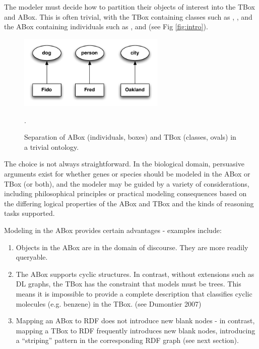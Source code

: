 \documentclass{my}
\begin{document}
The modeler must decide how to partition their objects of interest
into the TBox and ABox. This is often trivial, with the TBox
containing classes such as , ,  and the
ABox containing individuals such as ,  and
 (see Fig \ref{fig:intro}).

\begin{figure}
\center
\includegraphics[width=7cm]{intro}
\caption{Separation of ABox (individuals, boxes) and TBox (classes,
  ovals) in a trivial ontology. }.
\label{fig:into}
\end{figure}


The choice is not always straightforward. In the biological domain,
persuasive arguments exist for whether genes or species should be
modeled in the ABox or TBox (or both), and the modeler may be guided
by a variety of considerations, including philosophical principles or
practical modeling consequences based on the differing logical
properties of the ABox and TBox and the kinds of reasoning tasks
supported.

Modeling in the ABox provides certain advantages - examples include:

\begin{enumerate}

\item Objects in the ABox are in the domain of discourse. They are
  more readily queryable.

\item The ABox supports cyclic structures. In contrast, without
  extensions such as DL graphs, the TBox has the constraint that
  models must be trees. This means it is impossible to provide a
  complete description that classifies cyclic molecules (e.g. benzene)
  in the TBox. (see Dumontier 2007\cite{Dumontier2007})

\item Mapping an ABox to RDF does not introduce new blank nodes - in
  contrast, mapping a TBox to RDF frequently introduces new blank
  nodes, introducing a ``striping'' pattern in the corresponding RDF
  graph (see next section).

\end{enumerate}
\end{document}
